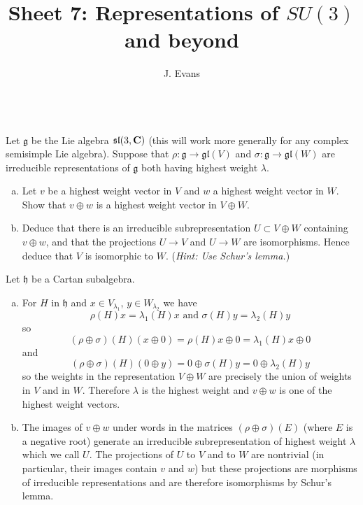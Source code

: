 \documentclass[12pt]{article}
\title{Sheet 7: Representations of $SU(3)$ and beyond}
\author{J. Evans}
\date{}
\begin{document}
\maketitle

\begin{question}\ \\
Let $\mathfrak{g}$ be the Lie algebra $\mathfrak{sl}(3,\mathbf{C})$ (this will work more generally for any complex semisimple Lie algebra). Suppose that $\rho\colon \mathfrak{g}\to \mathfrak{gl}(V)$ and $\sigma\colon \mathfrak{g}\to \mathfrak{gl}(W)$ are irreducible representations of $\mathfrak{g}$ both having highest weight $\lambda$.
\begin{enumerate}[(a)]
\item Let $v$ be a highest weight vector in $V$ and $w$ a highest weight vector in $W$. Show that $v\oplus w$ is a highest weight vector in $V\oplus W$.
\item Deduce that there is an irreducible subrepresentation $U\subset V\oplus W$ containing $v\oplus w$, and that the projections $U\to V$ and $U\to W$ are isomorphisms. Hence deduce that $V$ is isomorphic to $W$. ({\em Hint: Use Schur's lemma.})
\end{enumerate}
\end{question}

\begin{answer}
Let $\mathfrak{h}$ be a Cartan subalgebra.
\begin{enumerate}[(a)]
\item For $H$ in $\mathfrak{h}$ and $x\in V_{\lambda_1}$, $y\in W_{\lambda_2}$ we have
\[\rho(H)x=\lambda_1(H)x\mbox{ and }\sigma(H)y=\lambda_2(H)y\]
so
\[(\rho\oplus\sigma)(H)(x\oplus 0)=\rho(H)x\oplus 0=\lambda_1(H)x\oplus 0\]
and
\[(\rho\oplus\sigma)(H)(0\oplus y)=0\oplus \sigma(H)y=0\oplus \lambda_2(H)y\]
so the weights in the representation $V\oplus W$ are precisely the union of weights in $V$ and in $W$. Therefore $\lambda$ is the highest weight and $v\oplus w$ is one of the highest weight vectors.
\item The images of $v\oplus w$ under words in the matrices $(\rho\oplus\sigma)(E)$ (where $E$ is a negative root) generate an irreducible subrepresentation of highest weight $\lambda$ which we call $U$. The projections of $U$ to $V$ and to $W$ are nontrivial (in particular, their images contain $v$ and $w$) but these projections are morphisms of irreducible representations and are therefore isomorphisms by Schur's lemma.
\end{enumerate}
\end{answer}
\newpage
\end{document}
